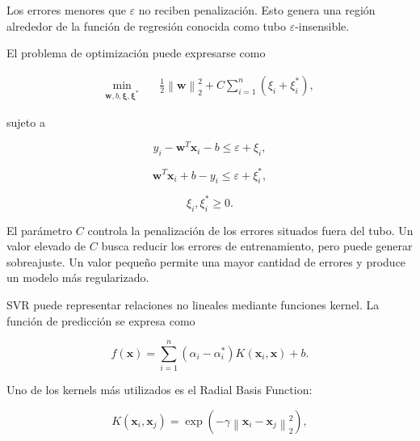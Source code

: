 Los errores menores que $\varepsilon$ no reciben penalización. Esto genera una región alrededor de la función de regresión conocida como tubo $\varepsilon$-insensible.

El problema de optimización puede expresarse como

\begin{equation}
\begin{split}
    \min_{\mathbf{w},b,\boldsymbol{\xi},\boldsymbol{\xi}^{*}}
    \quad&
    \frac{1}{2}
    \left\|
        \mathbf{w}
    \right\|_2^2
    +
    C
    \sum_{i=1}^{n}
    \left(
        \xi_i+\xi_i^{*}
    \right),
\end{split}
\end{equation}

sujeto a

\begin{equation}
    y_i-\mathbf{w}^{T}\mathbf{x}_i-b
    \leq
    \varepsilon+\xi_i,
\end{equation}

\begin{equation}
    \mathbf{w}^{T}\mathbf{x}_i+b-y_i
    \leq
    \varepsilon+\xi_i^{*},
\end{equation}

\begin{equation}
    \xi_i,\xi_i^{*}\geq 0.
\end{equation}

El parámetro $C$ controla la penalización de los errores situados fuera del tubo. Un valor elevado de $C$ busca reducir los errores de entrenamiento, pero puede generar sobreajuste. Un valor pequeño permite una mayor cantidad de errores y produce un modelo más regularizado.

SVR puede representar relaciones no lineales mediante funciones kernel. La función de predicción se expresa como

\begin{equation}
    f(\mathbf{x})
    =
    \sum_{i=1}^{n}
    \left(
        \alpha_i-\alpha_i^{*}
    \right)
    K(\mathbf{x}_i,\mathbf{x})
    +
    b.
\end{equation}

Uno de los kernels más utilizados es el Radial Basis Function:

\begin{equation}
    K(\mathbf{x}_i,\mathbf{x}_j)
    =
    \exp
    \left(
        -\gamma
        \left\|
            \mathbf{x}_i-\mathbf{x}_j
        \right\|_2^2
    \right),
\end{equation}

